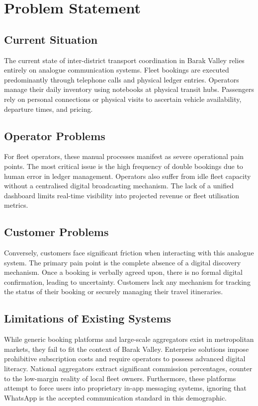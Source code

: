 \documentclass[12pt, a4paper, oneside]{report}
\begin{document}
\chapter{Problem Statement}

\section{Current Situation}
The current state of inter-district transport coordination in Barak Valley relies entirely on analogue communication systems. Fleet bookings are executed predominantly through telephone calls and physical ledger entries. Operators manage their daily inventory using notebooks at physical transit hubs. Passengers rely on personal connections or physical visits to ascertain vehicle availability, departure times, and pricing. 

\section{Operator Problems}
For fleet operators, these manual processes manifest as severe operational pain points. The most critical issue is the high frequency of double bookings due to human error in ledger management. Operators also suffer from idle fleet capacity without a centralised digital broadcasting mechanism. The lack of a unified dashboard limits real-time visibility into projected revenue or fleet utilisation metrics.

\section{Customer Problems}
Conversely, customers face significant friction when interacting with this analogue system. The primary pain point is the complete absence of a digital discovery mechanism. Once a booking is verbally agreed upon, there is no formal digital confirmation, leading to uncertainty. Customers lack any mechanism for tracking the status of their booking or securely managing their travel itineraries.

\section{Limitations of Existing Systems}
While generic booking platforms and large-scale aggregators exist in metropolitan markets, they fail to fit the context of Barak Valley. Enterprise solutions impose prohibitive subscription costs and require operators to possess advanced digital literacy. National aggregators extract significant commission percentages, counter to the low-margin reality of local fleet owners. Furthermore, these platforms attempt to force users into proprietary in-app messaging systems, ignoring that WhatsApp is the accepted communication standard in this demographic.
\end{document}
